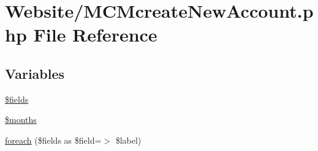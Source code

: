 \hypertarget{_m_c_mcreate_new_account_8php}{\section{Website/\-M\-C\-Mcreate\-New\-Account.php File Reference}
\label{_m_c_mcreate_new_account_8php}
}
\subsection*{Variables}
\begin{DoxyCompactItemize}
\item 
\hyperlink{_m_c_mcreate_new_account_8php_ab2303c817e3b402b77b7f99627b9c319}{\$fields}
\item 
\hyperlink{_m_c_mcreate_new_account_8php_a88a8980708982166840708b055e335b8}{\$months}
\item 
\hyperlink{_m_c_mcreate_new_account_8php_a58d12ec81e33be9b80508ee874adb2c1}{foreach} (\$fields as \$field=$>$ \$label)
\end{DoxyCompactItemize}


